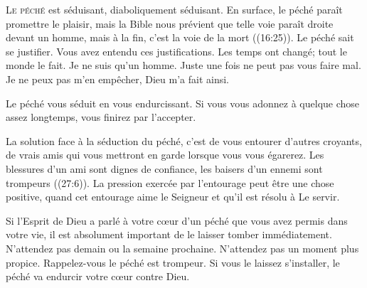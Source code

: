 \dvrule






\lettrine{L}{e péché} est séduisant, diaboliquement séduisant.
 En surface, le péché paraît promettre le plaisir,
 mais la Bible nous prévient que \Og telle 
 voie paraît droite devant un homme, mais à la fin,
 c'est la voie de la mort \Fg{} ((16:25)).
 Le péché sait se justifier. Vous avez entendu ces justifications.
 \Og Les temps ont changé; tout le monde le fait. \Fg{}
 \Og Je ne suis qu'un homme. \Fg{}
 \Og Juste une fois ne peut pas vous faire mal. \Fg{}
 \Og Je ne peux pas m'en empêcher, Dieu m'a fait ainsi. \Fg{}


Le péché vous séduit en vous endurcissant.
 Si vous vous adonnez à quelque chose assez longtemps,
 vous finirez par l'accepter. 

La solution face à la séduction du péché, c'est de vous entourer
 d'autres croyants, de vrais amis qui vous mettront en garde
 lorsque vous vous égarerez.
 \Og Les blessures d'un ami sont dignes de confiance,
 les baisers d'un ennemi sont trompeurs \Fg{} ((27:6)).
 La pression exercée par l'entourage peut être une chose positive,
 quand cet entourage aime le Seigneur et qu'il est résolu à Le servir. 

Si l'Esprit de Dieu a parlé à votre c\oe{}ur d'un péché que vous avez permis
 dans votre vie, il est absolument important de le laisser tomber
 immédiatement.
 N'attendez pas demain ou la semaine prochaine.
 N'attendez pas un moment plus propice. Rappelez-vous\frcolon{}
 le péché est trompeur.
 Si vous le laissez s'installer,
 le péché va endurcir votre c\oe{}ur contre Dieu. 

\dvrule



